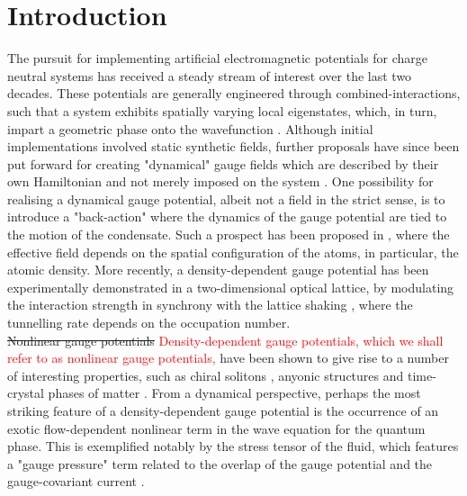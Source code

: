 \documentclass[twocolumn, nofootinbib, nobibnotes, amsmath,amssymb,aps, pra, floatfix]{revtex4-1}
\begin{document}
\section{Introduction}
The pursuit for implementing artificial electromagnetic potentials for charge neutral systems has received a steady stream of interest over the last two decades.
These potentials are generally engineered through combined-interactions, such that a system exhibits spatially varying local eigenstates, which, in turn, impart a geometric phase onto the wavefunction \cite{dalibard2011colloquium,goldman2014light,berry1984quantal,peskin1989aharonov}.
Although initial implementations involved static synthetic fields, further proposals have since been put forward for creating "dynamical" gauge fields which are described by their own Hamiltonian and not merely imposed on the system \cite{kapit2011optical,wiese2013ultracold,banerjee2012atomic,tagliacozzo2013simulation,zohar2013cold,tagliacozzo2013optical}.
One possibility for realising a dynamical gauge potential, albeit not a field in the strict sense, is to introduce a "back-action" where the dynamics of the gauge potential are tied to the motion of the condensate.
Such a prospect has been proposed in \cite{edmonds2013,edmonds2013josephson,keilmann2011statistically,greschner2014density,cardarelli2016engineering,PhysRevLett.115.053002,PhysRevLett.117.205303}, where the effective field depends on the spatial configuration of the atoms, in particular, the atomic density.
More recently, a density-dependent gauge potential has been experimentally demonstrated in a two-dimensional optical lattice, by modulating the interaction strength in synchrony with the lattice shaking \cite{PhysRevLett.121.030402}, where the tunnelling rate depends on the occupation number.\\
\sout{Nonlinear gauge potentials} \textcolor{red}{Density-dependent gauge potentials, which we shall refer to as nonlinear gauge potentials,} have been shown to give rise to a number of interesting properties, such as chiral solitons \cite{edmonds2013,dingwall2018non,dingwall2019stability}, anyonic structures \cite{aglietti1996anyons} and time-crystal phases of matter \cite{ohberg2019quantum}.
From a dynamical perspective, perhaps the most striking feature of a density-dependent gauge potential is the occurrence of an exotic flow-dependent nonlinear term in the wave equation for the quantum phase.
This is exemplified notably by the stress tensor of the fluid, which features a "gauge pressure" term related to the overlap of the gauge potential and the gauge-covariant current \cite{buggy2020hydrodynamics}.
\end{document}

